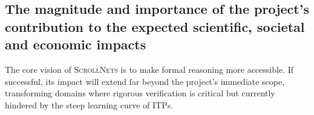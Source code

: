 \documentclass[12pt,draftproposal]{msca-pf}
\newcommand{\proj}{\small\textsc{ScrollNets}}
\begin{document}



\subsection{The magnitude and importance of the project’s contribution to the
    expected scientific, societal and economic impacts}
\label{ssc:impact:future}

The core vision of {\proj} is to make formal reasoning more accessible. If successful, its impact will extend far beyond the project's immediate scope, transforming domains where rigorous verification is critical but currently hindered by the steep learning curve of ITPs.
\end{document}
